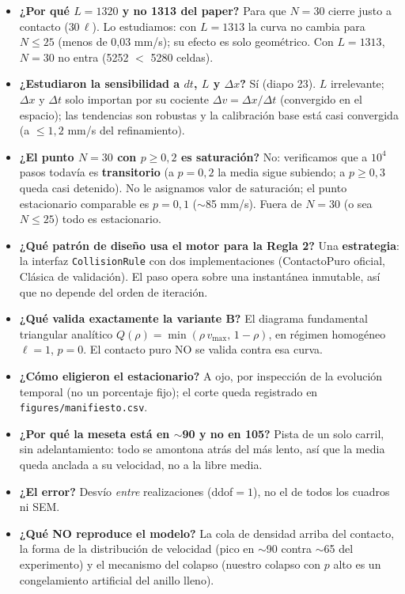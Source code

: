 \documentclass[11pt,a4paper]{article}
\begin{document}
\begin{itemize}[leftmargin=1.2em,itemsep=3pt]
\item \textbf{¿Por qué $L=1320$ y no 1313 del paper?} Para que $N=30$ cierre justo a contacto ($30\,\ell$).
  Lo estudiamos: con $L=1313$ la curva no cambia para $N\le25$ (menos de 0,03 mm/s); su efecto es solo
  geométrico. Con $L=1313$, $N=30$ no entra (5252 $<$ 5280 celdas).
\item \textbf{¿Estudiaron la sensibilidad a $dt$, $L$ y $\Delta x$?} Sí (diapo 23). $L$ irrelevante; $\Delta x$
  y $\Delta t$ solo importan por su cociente $\Delta v=\Delta x/\Delta t$ (convergido en el espacio); las
  tendencias son robustas y la calibración base está casi convergida (a $\le1{,}2$ mm/s del refinamiento).
\item \textbf{¿El punto $N=30$ con $p\ge0{,}2$ es saturación?} No: verificamos que a $10^4$ pasos todavía es
  \textbf{transitorio} (a $p=0{,}2$ la media sigue subiendo; a $p\ge0{,}3$ queda casi detenido). No le
  asignamos valor de saturación; el punto estacionario comparable es $p=0{,}1$ ($\sim$85 mm/s). Fuera de
  $N=30$ (o sea $N\le25$) todo es estacionario.
\item \textbf{¿Qué patrón de diseño usa el motor para la Regla 2?} Una \textbf{estrategia}: la interfaz
  \texttt{CollisionRule} con dos implementaciones (ContactoPuro oficial, Clásica de validación). El paso opera
  sobre una instantánea inmutable, así que no depende del orden de iteración.
\item \textbf{¿Qué valida exactamente la variante B?} El diagrama fundamental triangular analítico
  $Q(\rho)=\min(\rho\,v_{\max},\,1-\rho)$, en régimen homogéneo $\ell=1$, $p=0$. El contacto puro NO se
  valida contra esa curva.
\item \textbf{¿Cómo eligieron el estacionario?} A ojo, por inspección de la evolución temporal (no un
  porcentaje fijo); el corte queda registrado en \texttt{figures/manifiesto.csv}.
\item \textbf{¿Por qué la meseta está en $\sim$90 y no en 105?} Pista de un solo carril, sin adelantamiento:
  todo se amontona atrás del más lento, así que la media queda anclada a su velocidad, no a la libre media.
\item \textbf{¿El error?} Desvío \emph{entre} realizaciones (ddof$=1$), no el de todos los cuadros ni SEM.
\item \textbf{¿Qué NO reproduce el modelo?} La cola de densidad arriba del contacto, la forma de la
  distribución de velocidad (pico en $\sim$90 contra $\sim$65 del experimento) y el mecanismo del colapso
  (nuestro colapso con $p$ alto es un congelamiento artificial del anillo lleno).
\end{itemize}
\end{document}
